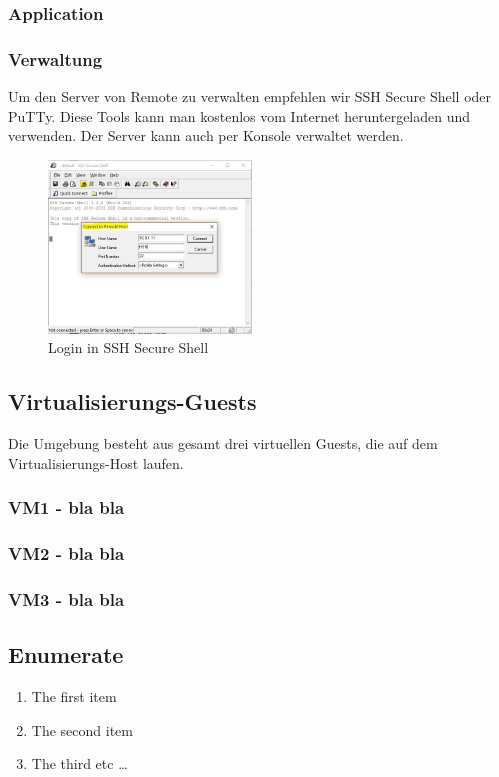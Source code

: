 \documentclass[a4,12pt]{scrartcl}
\begin{document}
\subsubsection{Application}

\newpage
\subsubsection{Verwaltung}
Um den Server von Remote zu verwalten empfehlen wir SSH Secure Shell oder PuTTy. Diese Tools kann man kostenlos vom Internet heruntergeladen und verwenden. Der Server kann auch per Konsole verwaltet werden.
\begin{figure} [H]
\begin{center}
\includegraphics[width=0.48\textwidth]{./pictures/ssh_login.jpg}
\caption{Login in SSH Secure Shell}
\end{center}
\end{figure}

\subsection{Virtualisierungs-Guests}
Die Umgebung besteht aus gesamt drei virtuellen Guests, die auf dem Virtualisierungs-Host laufen. 
\subsubsection{VM1 - bla bla}
\subsubsection{VM2 - bla bla}
\subsubsection{VM3 - bla bla}
\newpage
\subsection{Enumerate}
\begin{enumerate}
  \item The first item
  \item The second item
  \item The third etc \ldots
\end{enumerate}
\end{document}
